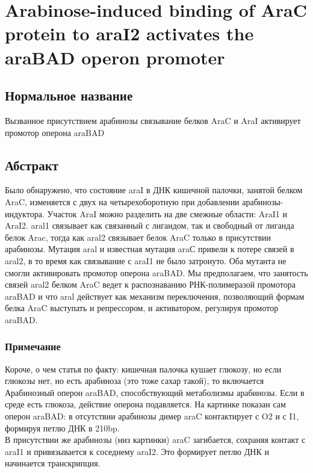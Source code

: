 \section{Arabinose-induced binding of AraC protein to araI2 activates the araBAD operon promoter}

\subsection{Нормальное название}

Вызванное присутствием арабинозы связывание белков AraC и AraI активирует промотор оперона araBAD

\subsection{Абстракт}
Было обнаружено, что состояние araI в ДНК кишечной палочки, занятой белком AraC, изменяется с двух на четырехоборотную при добавлении арабинозы-индуктора.  Участок AraI можно разделить на две смежные области: AraI1 и AraI2.  aral1 связывает как связанный с лигандом, так и свободный от лиганда белок Arac, тогда как aral2  связывает белок AraC только в присутствии арабинозы.  Мутация aral и известная мутация araС привели к потере связей в aral2, в то время как связывание с araI1 не было затронуто.  Оба мутанта не смогли активировать промотор оперона araBAD.  Мы предполагаем, что занятость связей aral2 белком AraC ведет к распознаванию РНК-полимеразой промотора araBAD и что aral действует как механизм переключения, позволяющий формам белка AraC выступать и репрессором, и активатором, регулируя промотор araBAD. 

\subsubsection{Примечание}
Короче, о чем статья по факту: кишечная палочка кушает глюкозу, но если глюкозы нет, но есть арабиноза (это тоже сахар такой), то включается Арабинозный оперон araBAD, способствующий метаболизмы арабинозы. Если в среде есть глюкоза, действие оперона подавляется.
На картинке показан сам оперон araBAD: в отсутствии арабинозы димер araC контактирует с O2 и с I1, формируя петлю ДНК в 210bp.
\\
В присутствии же арабинозы (низ картинки) araC загибается, сохраняя контакт с araI1 и привязывается к соседнему araI2. Это формирует петлю ДНК и начинается транскрипция.


